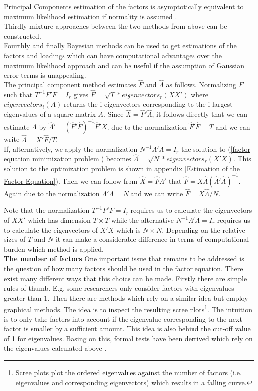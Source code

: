 \documentclass[12pt]{article}
\begin{document}
Principal Components estimation of the factors is asymptotically equivalent to maximum likelihood estimation if normality is assumed \citep{bai2003inferential}. \\
Thirdly mixture approaches between the two methods from above can be constructed. \\
Fourthly and finally Bayesian methods can be used to get estimations of the factors and loadings which can have computational advantages over the maximum likelihood approach and can be useful if the assumption of Gaussian error terms is unappealing. \\

The principal component method estimates $\hat F$ and $\hat \Lambda$ as follows. Normalizing $F$ such that $T^{-1}F'F = I_r$ gives $\hat F = \sqrt{T} * eigenvectors_r(XX')$ where $eigenvectors_i(A)$ returns the i eigenvectors corresponding to the i largest eigenvalues of a square matrix $A$. Since $\hat X = \hat F' \hat \Lambda$, it follows directly that we can estimate $\Lambda$ by $\hat \Lambda' = (\hat F' \hat F)^{-1} \hat F'X$. due to the normalization $\hat F' \hat F = T$ and we can write $\hat \Lambda = X' \hat F / T$. \\
If, alternatively, we apply the normalization $N^{-1}\Lambda'\Lambda = I_r$ the solution to (\ref{factor equation minimization problem}) becomes $\hat \Lambda = \sqrt{N} * eigenvectors_r(X'X)$. This solution to the optimization problem is shown in appendix \ref{Estimation of the Factor Equation}). Then we can follow from $\hat X = \hat F \hat \Lambda'$ that $\hat F = X \hat \Lambda (\hat \Lambda' \hat \Lambda)^{-1}$. Again due to the normalization $\Lambda' \Lambda = N$ and we can write $\hat F = X \hat \Lambda / N$.

Note that the normalization $T^{-1}F'F = I_r$ requires us to calculate the eigenvectors of $XX'$ which has dimension $T \times T$ while the alternative $N^{-1}\Lambda'\Lambda = I_r$ requires us to calculate the eigenvectors of $X'X$ which is $N \times N$. Depending on the relative sizes of $T$ and $N$ it can make a considerable difference in terms of computational burden which method is applied. \\

\textbf{The number of factors}
One important issue that remains to be addressed is the question of how many factors should be used in the factor equation. There exist many different ways that this choice can be made. Firstly there are simple rules of thumb. E.g. some researchers only consider factors with eigenvalues greater than $1$. Then there are methods which rely on a similar idea but employ graphical methods. The idea is to inspect the resulting scree plots\footnote{Scree plots plot the ordered eigenvalues against the number of factors (i.e. eigenvalues and corresponding eigenvectors) which results in a falling curve.}. The intuition is to only take factors into account if the eigenvalue corresponding to the next factor is smaller by a sufficient amount. This idea is also behind the cut-off value of 1 for eigenvalues. Basing on this, formal tests have been derrived which rely on the eigenvalues calculated above \citep{stock2011dynamic}.
\end{document}
